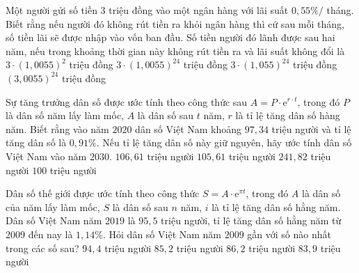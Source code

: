 \begin{ex}%
	Một người gửi số tiền $3$ triệu đồng vào một ngân hàng với lãi suất $0{,}55\% /$ tháng. Biết rằng nếu người đó không rút tiền ra  khỏi ngân hàng thì cứ sau mỗi tháng, số tiền lãi sẽ được nhập vào vốn ban đầu. Số tiền người đó lãnh được sau hai năm, nếu trong khoảng thời gian này không rút tiền ra và lãi suất không đổi là
	 \choice
		 {$3\cdot\left(1{,}0055\right)^2$ triệu đồng}
		{\True  $3\cdot\left(1{,}0055\right)^{24}$ triệu đồng}
		{$3\cdot\left(1{,}055\right)^{24}$  triệu đồng}
		 {$\left(3{,}0055\right)^{24}$ triệu đồng}
\end{ex}

\begin{ex}%
	Sự tăng trưởng dân số được ước tính theo công thức sau $A=P\cdot\mathrm{e}^{r\cdot t}$, trong đó $P$ là dân số năm lấy làm mốc, $A$ là dân số sau $t$ năm, $r$ là tỉ lệ tăng dân  số hàng năm. Biết rằng vào năm $2020$ dân số Việt Nam khoảng $97{,}34$ triệu người và tỉ lệ tăng dân số là $0{,}91\%$. Nếu tỉ lệ tăng dân số này giữ nguyên, hãy ước tính dân số Việt Nam vào năm $2030$.
	\choice 
		{\True $106{,}61$  triệu người}
		{$105{,}61$ triệu người} 
		 {$241{,}82$ triệu người}
		{$100$ triệu người} 
\end{ex}

\begin{ex}%
	Dân số thế giới được ước tính theo công thức $S=A\cdot \mathrm{e}^{\pi t}$, trong đó $A$ là dân số của năm lấy làm mốc, $S$ là dân số sau $n$ năm, $i$ là tỉ lệ tăng dân số hằng năm. Dân số Việt Nam năm $2019$ là $95{,}5$ triệu người, tỉ lệ tăng dân số hằng năm từ 2009 đến nay là $1{,}14\%$. Hỏi dân số Việt Nam năm $2009$ gần với  số nào nhất trong các số sau?
	 \choice
		 {$94{,}4$ triệu người}
		 {\True $85{,}2$ triệu người}
		{$86{,}2$ triệu  người}
		 {$83{,}9$ triệu người}
\end{ex}

